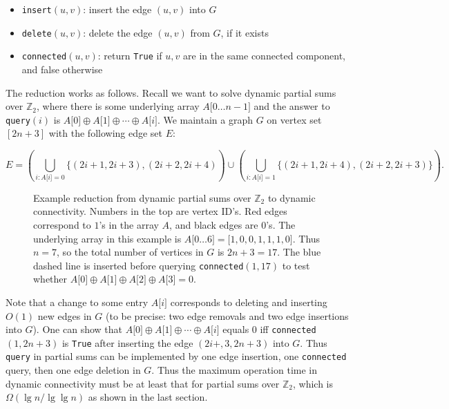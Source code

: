\documentclass[11pt]{article}
\begin{document}
\begin{itemize}
\item \texttt{insert}$(u, v)$: insert the edge $(u, v)$ into $G$
\item \texttt{delete}$(u, v)$: delete the edge $(u, v)$ from $G$, if it exists
\item \texttt{connected}$(u, v)$: return \texttt{True} if $u, v$ are in the same connected component, and false otherwise
\end{itemize}

The reduction works as follows. Recall we want to solve dynamic partial sums over $\mathbb Z_2$, where there is some underlying array $A\text{[}0\ldots n-1\text{]}$ and the answer to \texttt{query}$(i)$ is $A\text{[}0\text{]}\oplus A\text{[}1\text{]}\oplus \cdots \oplus A\text{[}i\text{]}$. We maintain a graph $G$ on vertex set $[2n+3]$ with the following edge set $E$:

$$
E = \left(\bigcup_{i : A\text{[}i\text{]} = 0} \{(2i+1, 2i+3), (2i+2, 2i+4)\right) \cup \left(\bigcup_{i : A\text{[}i\text{]} = 1} \{(2i+1, 2i+4), (2i+2, 2i+3) \}\right) .
$$

\begin{figure}
\begin{center}
\end{center}
\caption{Example reduction from dynamic partial sums over $\mathbb Z_2$ to dynamic connectivity. Numbers in the top are vertex ID's. Red edges correspond to $1$'s in the array $A$, and black edges are $0$'s. The underlying array in this example is $A\text{[}0\ldots 6\text{]} = \text{[}1, 0, 0, 1, 1, 1, 0\text{]}$. Thus $n = 7$, so the total number of vertices in $G$ is $2n + 3 = 17$. The blue dashed line is inserted before querying \texttt{connected}$(1, 17)$ to test whether $A\text{[}0\text{]}\oplus A\text{[}1\text{]}\oplus A\text{[}2\text{]}\oplus A\text{[}3\text{]} = 0$.}\label{fig:reduction}
\end{figure}

Note that a change to some entry $A\text{[}i\text{]}$ corresponds to deleting and inserting $O(1)$ new edges in $G$ (to be precise: two edge removals and two edge insertions into $G$). One can show that $A\text{[}0\text{]}\oplus A\text{[}1\text{]}\oplus \cdots \oplus A\text{[}i\text{]}$ equals $0$ iff \texttt{connected}$(1, 2n+3)$ is \texttt{True} after inserting the edge $(2i+,3, 2n+3)$ into $G$. Thus \texttt{query} in partial sums can be implemented by one edge insertion, one \texttt{connected} query, then one edge deletion in $G$. Thus the maximum operation time in dynamic connectivity must be at least that for partial sums over $\mathbb Z_2$, which is $\Omega(\lg n / \lg\lg n)$ as shown in the last section.
\end{document}

